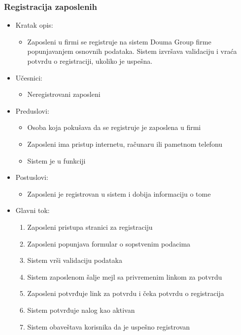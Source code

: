 \documentclass[a4paper]{article}
\begin{document}
\subsubsection{Registracija zaposlenih}
\begin{itemize}
    \item Kratak opis: 
    \begin{itemize}
        \item Zaposleni u firmi se registruje na sistem Douma Group firme popunjavanjem osnovnih podataka. Sistem izvršava validaciju i vraća potvrdu o registraciji, ukoliko je uspešna.
    \end{itemize}
    \item Učesnici:
        \begin{itemize}
        \item Neregistrovani zaposleni
    \end{itemize}
    \item Preduslovi:
        \begin{itemize}
            \item Osoba koja pokušava da se registruje je zaposlena u firmi
            \item Zaposleni ima pristup internetu, računaru ili pametnom telefonu
            \item Sistem je u funkciji
        \end{itemize}
    \item Postuslovi:
        \begin{itemize}
            \item Zaposleni je registrovan u sistem i dobija informaciju o tome
        \end{itemize}
    \item Glavni tok:
        \begin{enumerate}
            \item Zaposleni pristupa stranici za registraciju
            \item Zaposleni popunjava formular o sopstvenim podacima 
            \item Sistem vrši validaciju podataka 
            \item Sistem zaposlenom šalje mejl sa privremenim linkom za potvrdu
            \item Zaposleni potvrđuje link za potvrdu i čeka potvrdu o registracija
            \item Sistem potvrđuje nalog kao aktivan
            \item Sistem obaveštava korisnika da je uspešno registrovan 

\end{enumerate}
\end{itemize}
\end{document}
